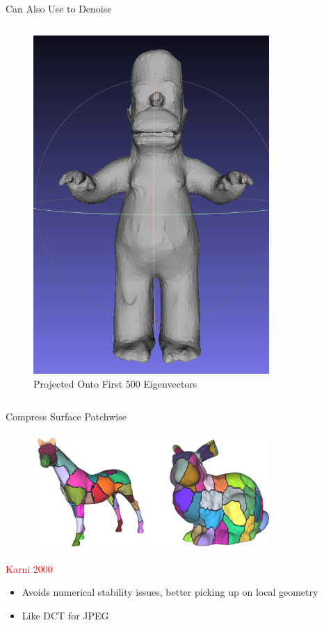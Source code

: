 \documentclass{beamer}
\begin{document}
\begin{frame}{Can Also Use to Denoise}
\begin{columns}
\begin{column}[T]{5cm}
\begin{figure}[t]
    \includegraphics[width=0.8\textwidth]{DenoisedHomer.png}
    \caption*{Projected Onto First 500 Eigenvectors}
\end{figure}
\end{column}
\end{columns}

\end{frame}

\begin{frame}{Compress Surface Patchwise}

\begin{figure}[t]
    \includegraphics[width=0.8\textwidth]{Karni2000.png}
\end{figure}

\small
\textcolor{red}{Karni 2000}

\begin{itemize}[label=$\vartriangleright$]
\item Avoids numerical stability issues, better picking up on local geometry

\item Like DCT for JPEG
\end{itemize}

\end{frame}
\end{document}
